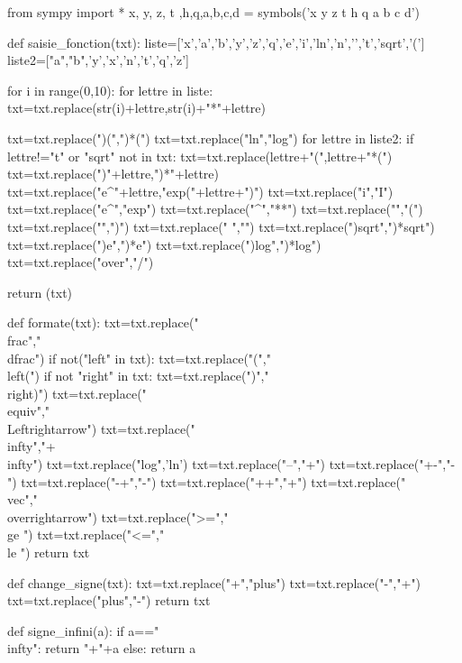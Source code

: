 \begin{pycode}
from sympy import *
x, y, z, t ,h,q,a,b,c,d = symbols('x y z t h q a b c d')

def saisie_fonction(txt):
    liste=['x','a','b','y','z','q','e','i','ln','n','\pi','t','sqrt','(']
    liste2=["a","b",'y','x','n','t','q','z']

    for i in range(0,10):
        for lettre in liste:
            txt=txt.replace(str(i)+lettre,str(i)+"*"+lettre)

    txt=txt.replace(")(",")*(")
    txt=txt.replace("ln","log")
    for lettre in liste2:
        if lettre!="t" or "sqrt" not in txt:
            txt=txt.replace(lettre+"(",lettre+"*(")
        txt=txt.replace(")"+lettre,")*"+lettre)
        txt=txt.replace("e^"+lettre,"exp("+lettre+")")
    txt=txt.replace("i","I")
    txt=txt.replace("e^","exp")
    txt=txt.replace("^","**")
    txt=txt.replace("{","(")
    txt=txt.replace("}",")")
    txt=txt.replace(" ","")
    txt=txt.replace(")sqrt",")*sqrt")
    txt=txt.replace(")e",")*e")
    txt=txt.replace(")log",")*log")
    txt=txt.replace("over","/")

    return (txt)


def formate(txt):
    txt=txt.replace("\\frac","\\dfrac")
    if not("left" in txt):
        txt=txt.replace("(","\\left(")
    if not "right" in txt:
        txt=txt.replace(")","\\right)")
    txt=txt.replace("\\equiv","\\Leftrightarrow")
    txt=txt.replace("\\infty","+\\infty")
    txt=txt.replace("log",'ln')
    txt=txt.replace("--","+")
    txt=txt.replace("+-","-")
    txt=txt.replace("-+","-")
    txt=txt.replace("++","+")
    txt=txt.replace("\\vec","\\overrightarrow")
    txt=txt.replace(">="," \\ge ")
    txt=txt.replace("<="," \\le ")
    return txt

def change_signe(txt):
    txt=txt.replace("+","plus")
    txt=txt.replace("-","+")
    txt=txt.replace("plus","-")
    return txt

def signe_infini(a):
    if a=="\\infty":
        return "+"+a
    else:
        return a



\end{pycode}
